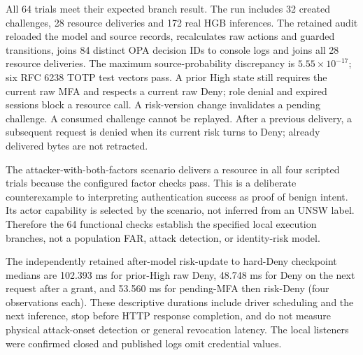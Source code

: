 All 64 trials meet their expected branch result.
The run includes 32 created challenges,
28 resource deliveries and 172 real HGB
inferences. The retained audit reloaded the
model and source records, recalculates raw
actions and guarded transitions, joins 84
distinct OPA decision IDs to console logs and
joins all 28 resource deliveries. The maximum
source-probability discrepancy is
\(5.55\times10^{-17}\); six RFC 6238 TOTP
test vectors pass. A prior High state still
requires the current raw MFA and respects a
current raw Deny; role denial and expired
sessions block a resource call. A risk-version
change invalidates a pending challenge. A
consumed challenge cannot be replayed.
After a previous delivery, a subsequent
request is denied when its current risk
turns to Deny; already delivered bytes
are not retracted.

The attacker-with-both-factors scenario
delivers a resource in all four scripted
trials because the configured factor
checks pass. This is a deliberate
counterexample to interpreting
authentication success as proof of
benign intent. Its actor capability is
selected by the scenario, not inferred
from an UNSW label. Therefore the 64
functional checks establish the specified
local execution branches, not a
population FAR, attack detection, or
identity-risk model.

The independently retained after-model
risk-update to hard-Deny checkpoint
medians are 102.393 ms for prior-High
raw Deny, 48.748 ms for Deny on the
next request after a grant, and
53.560 ms for pending-MFA then
risk-Deny (four observations each).
These descriptive durations include
driver scheduling and the next
inference, stop before HTTP response
completion, and do not measure
physical attack-onset detection or
general revocation latency. The
local listeners were confirmed
closed and published logs omit
credential values.
